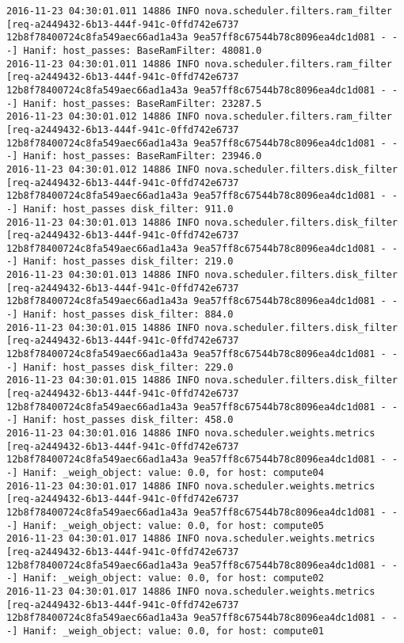 \begin{lstlisting}[frame=single, caption={The filter scheduler log trace for 10 virtual instances}, label={lst:filterschedulercodetracelog10vi}, escapechar=|]
2016-11-23 04:30:01.011 14886 INFO nova.scheduler.filters.ram_filter [req-a2449432-6b13-444f-941c-0ffd742e6737 12b8f78400724c8fa549aec66ad1a43a 9ea57ff8c67544b78c8096ea4dc1d081 - - -] Hanif: host_passes: BaseRamFilter: 48081.0
2016-11-23 04:30:01.011 14886 INFO nova.scheduler.filters.ram_filter [req-a2449432-6b13-444f-941c-0ffd742e6737 12b8f78400724c8fa549aec66ad1a43a 9ea57ff8c67544b78c8096ea4dc1d081 - - -] Hanif: host_passes: BaseRamFilter: 23287.5
2016-11-23 04:30:01.012 14886 INFO nova.scheduler.filters.ram_filter [req-a2449432-6b13-444f-941c-0ffd742e6737 12b8f78400724c8fa549aec66ad1a43a 9ea57ff8c67544b78c8096ea4dc1d081 - - -] Hanif: host_passes: BaseRamFilter: 23946.0
2016-11-23 04:30:01.012 14886 INFO nova.scheduler.filters.disk_filter [req-a2449432-6b13-444f-941c-0ffd742e6737 12b8f78400724c8fa549aec66ad1a43a 9ea57ff8c67544b78c8096ea4dc1d081 - - -] Hanif: host_passes disk_filter: 911.0
2016-11-23 04:30:01.013 14886 INFO nova.scheduler.filters.disk_filter [req-a2449432-6b13-444f-941c-0ffd742e6737 12b8f78400724c8fa549aec66ad1a43a 9ea57ff8c67544b78c8096ea4dc1d081 - - -] Hanif: host_passes disk_filter: 219.0
2016-11-23 04:30:01.013 14886 INFO nova.scheduler.filters.disk_filter [req-a2449432-6b13-444f-941c-0ffd742e6737 12b8f78400724c8fa549aec66ad1a43a 9ea57ff8c67544b78c8096ea4dc1d081 - - -] Hanif: host_passes disk_filter: 884.0
2016-11-23 04:30:01.015 14886 INFO nova.scheduler.filters.disk_filter [req-a2449432-6b13-444f-941c-0ffd742e6737 12b8f78400724c8fa549aec66ad1a43a 9ea57ff8c67544b78c8096ea4dc1d081 - - -] Hanif: host_passes disk_filter: 229.0
2016-11-23 04:30:01.015 14886 INFO nova.scheduler.filters.disk_filter [req-a2449432-6b13-444f-941c-0ffd742e6737 12b8f78400724c8fa549aec66ad1a43a 9ea57ff8c67544b78c8096ea4dc1d081 - - -] Hanif: host_passes disk_filter: 458.0
2016-11-23 04:30:01.016 14886 INFO nova.scheduler.weights.metrics [req-a2449432-6b13-444f-941c-0ffd742e6737 12b8f78400724c8fa549aec66ad1a43a 9ea57ff8c67544b78c8096ea4dc1d081 - - -] Hanif: _weigh_object: value: 0.0, for host: compute04
2016-11-23 04:30:01.017 14886 INFO nova.scheduler.weights.metrics [req-a2449432-6b13-444f-941c-0ffd742e6737 12b8f78400724c8fa549aec66ad1a43a 9ea57ff8c67544b78c8096ea4dc1d081 - - -] Hanif: _weigh_object: value: 0.0, for host: compute05
2016-11-23 04:30:01.017 14886 INFO nova.scheduler.weights.metrics [req-a2449432-6b13-444f-941c-0ffd742e6737 12b8f78400724c8fa549aec66ad1a43a 9ea57ff8c67544b78c8096ea4dc1d081 - - -] Hanif: _weigh_object: value: 0.0, for host: compute02
2016-11-23 04:30:01.017 14886 INFO nova.scheduler.weights.metrics [req-a2449432-6b13-444f-941c-0ffd742e6737 12b8f78400724c8fa549aec66ad1a43a 9ea57ff8c67544b78c8096ea4dc1d081 - - -] Hanif: _weigh_object: value: 0.0, for host: compute01

\end{lstlisting}
